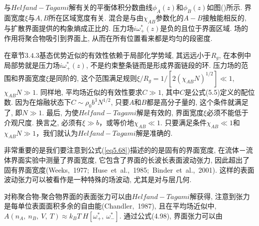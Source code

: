 \par
与$Helfand-Tagami$解有关的平衡体积分数曲线$\phi_{A}(z)$和$\phi_{B}(z)$如图()所示.
界面宽度$\xi$与$A, B$所在区域宽度有关.
混合是与由$\chi_{AB}$参数化的$A-B$接触能相反的, 与扩散界面提供的构象熵成正比的.
压力场$i\omega^{*}_{+}(z)$是负的且位于界面区域. 场的作用将聚合物吸引到界面上,
从而在所有位置看来都是均匀的段密度.
\par
在章节$3.4.3$基态优势近似的有效性依赖于局部化学势域, 其远远小于$R_{g}$,
在本例中局部势就是压力场$i\omega^{*}_{+}(z)$,
不是约束整条链而是形成界面链段的环. 压力场的范围和界面宽度$\xi$是同阶的,
这个范围满足规则$\xi/R_{g}=1/[2(\chi_{AB}N)^{1/2}]\ll 1$, $\chi_{AB}N\gg 1$.
同样地, 平均场近似的有效性要求$C\gg 1$, 其中$C$是公式(5.5)定义的配位数.
因为在熔融状态下$C\sim \rho_{0}b^{3}N^{1/2}$, 只要$A$和$B$都是高分子量的,
这个条件就满足了, 即$N\gg 1$. 最后, 为使$Helfand-Tagami$解是有效的,
界面宽度$\xi$必须不能低于介观尺度. 换言之, 必须有$\xi\gg
b$，或等价地$\chi_{AB}\ll 1$. 只要满足条件$\chi_{AB}\ll 1$和$\chi_{AB}N\gg
1$，我们就认为$Helfand-Tagami$解是准确的. 
\par
非常重要的是我们要注意到公式(\ref{eq5.68})描述的的是固有的界面宽度,
在流体－流体界面实验中测量了界面宽度, 它包含了界面的长波长表面波动张力,
因此超出了固有界面宽度(Weeks,\ 1977;\ Huse\ et\ al.,\ 1985;\ Binder\ et\ al.,\
2001). 这样的表面波动张力可以被看作是一种特殊的场波动, 尤其是对与层几何.
\par
对称聚合物-聚合物界面的表面张力可以由$Helfand-Tagami$解获得,
注意到张力是每单位表面面积多余的自由能(Chandler,\ 1987), 且在平均场近似中,
$A(n_{A},\ n_{B},\ V,\ T)\approx k_{B}T\ H[\omega^{*}_{+},\ \omega^{*}_{-}]$.
通过公式(4.98), 界面张力可以由

